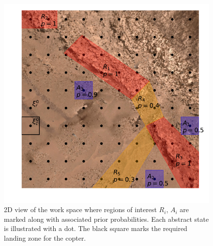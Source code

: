 \documentclass[conference]{IEEEtran}
\begin{document}
\begin{figure}
  \begin{center}
    \includegraphics[width=0.6\columnwidth]{2figs/arena-MARS.pdf}
  \end{center}
  \caption{2D view of the work space where regions of interest $R_i$, $A_i$ are marked along with associated prior probabilities. Each abstract state is illustrated with a dot. The black square marks the required landing zone for the copter.}
  \label{fig:workspacemars}
\end{figure}
\end{document}
